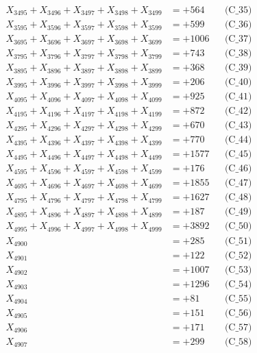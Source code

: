 \documentclass[a4paper,10pt]{article}
\begin{document}
{\begin{align}
X_{3495} + X_{3496} + X_{3497} + X_{3498} + X_{3499} &= +564 && \text{(C\_35)} \\
\allowbreak
X_{3595} + X_{3596} + X_{3597} + X_{3598} + X_{3599} &= +599 && \text{(C\_36)} \\
X_{3695} + X_{3696} + X_{3697} + X_{3698} + X_{3699} &= +1006 && \text{(C\_37)} \\
X_{3795} + X_{3796} + X_{3797} + X_{3798} + X_{3799} &= +743 && \text{(C\_38)} \\
X_{3895} + X_{3896} + X_{3897} + X_{3898} + X_{3899} &= +368 && \text{(C\_39)} \\
X_{3995} + X_{3996} + X_{3997} + X_{3998} + X_{3999} &= +206 && \text{(C\_40)} \\
\allowbreak
X_{4095} + X_{4096} + X_{4097} + X_{4098} + X_{4099} &= +925 && \text{(C\_41)} \\
X_{4195} + X_{4196} + X_{4197} + X_{4198} + X_{4199} &= +872 && \text{(C\_42)} \\
X_{4295} + X_{4296} + X_{4297} + X_{4298} + X_{4299} &= +670 && \text{(C\_43)} \\
X_{4395} + X_{4396} + X_{4397} + X_{4398} + X_{4399} &= +770 && \text{(C\_44)} \\
X_{4495} + X_{4496} + X_{4497} + X_{4498} + X_{4499} &= +1577 && \text{(C\_45)} \\
\allowbreak
X_{4595} + X_{4596} + X_{4597} + X_{4598} + X_{4599} &= +176 && \text{(C\_46)} \\
X_{4695} + X_{4696} + X_{4697} + X_{4698} + X_{4699} &= +1855 && \text{(C\_47)} \\
X_{4795} + X_{4796} + X_{4797} + X_{4798} + X_{4799} &= +1627 && \text{(C\_48)} \\
X_{4895} + X_{4896} + X_{4897} + X_{4898} + X_{4899} &= +187 && \text{(C\_49)} \\
X_{4995} + X_{4996} + X_{4997} + X_{4998} + X_{4999} &= +3892 && \text{(C\_50)} \\
\allowbreak
X_{4900} &= +285 && \text{(C\_51)} \\
X_{4901} &= +122 && \text{(C\_52)} \\
X_{4902} &= +1007 && \text{(C\_53)} \\
X_{4903} &= +1296 && \text{(C\_54)} \\
X_{4904} &= +81 && \text{(C\_55)} \\
\allowbreak
X_{4905} &= +151 && \text{(C\_56)} \\
X_{4906} &= +171 && \text{(C\_57)} \\
X_{4907} &= +299 && \text{(C\_58)} \\

\end{align}}
\end{document}
